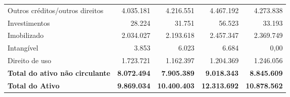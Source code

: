 \documentclass[1pt,a4paper]{article}
\begin{document}
\begin{longtable}{p{6cm}r r r r }
			Outros créditos/outros direitos & 4.035.181 & 4.216.551 & 4.467.192 & 4.273.838 \\
			Investimentos & 28.224 & 31.751 & 56.523 & 33.193 \\
			Imobilizado & 2.034.027 & 2.193.618 & 2.457.347 & 2.369.749 \\
			Intangível & 3.853 & 6.023 & 6.684 & 0,00 \\
			Direito de uso & 1.723.721 & 1.162.397 & 1.204.369 & 1.246.056 \\
			\rowcolor{darkgray}\textbf{Total do ativo não circulante} & \textbf{8.072.494} & \textbf{7.905.389} & \textbf{9.018.343} & \textbf{8.845.609} \\
			\midrule
			\rowcolor{darkgray}\textbf{Total do Ativo} & \textbf{9.869.034 } & \textbf{10.400.403} & \textbf{12.313.692} & \textbf{10.878.562} \\
			\bottomrule
		\end{longtable}
		
		
		
\end{document}
